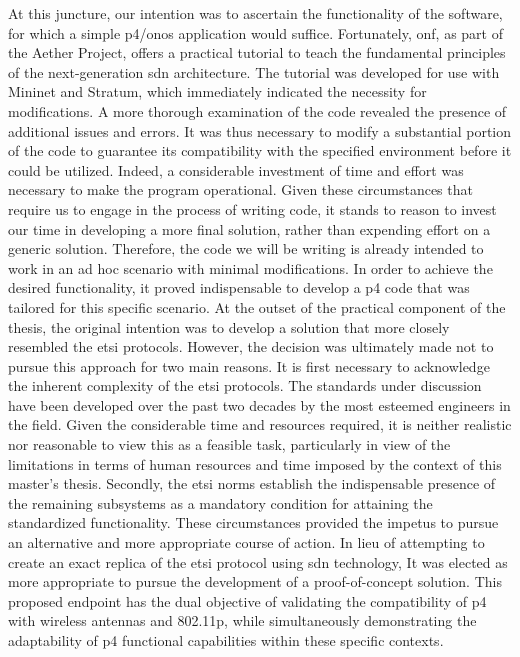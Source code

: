 At this juncture, our intention was to ascertain the functionality of the software, for which a simple \gls{p4}/\gls{onos} application would suffice. Fortunately, \gls{onf}, as part of the Aether Project, offers a practical tutorial to teach the fundamental principles of the next-generation \gls{sdn} architecture. The tutorial was developed for use with Mininet and Stratum, which immediately indicated the necessity for modifications. A more thorough examination of the code revealed the presence of additional issues and errors. It was thus necessary to modify a substantial portion of the code to guarantee its compatibility with the specified environment before it could be utilized. Indeed, a considerable investment of time and effort was necessary to make the program operational. Given these circumstances that require us to engage in the process of writing code, it stands to reason to invest our time in developing a more final solution, rather than expending effort on a generic solution. Therefore, the code we will be writing is already intended to work in an ad hoc scenario with minimal modifications.
In order to achieve the desired functionality, it proved indispensable to develop a \gls{p4} code that was tailored for this specific scenario. At the outset of the practical component of the thesis, the original intention was to develop a solution that more closely resembled the \gls{etsi} protocols. However, the decision was ultimately made not to pursue this approach for two main reasons. It is first necessary to acknowledge the inherent complexity of the \gls{etsi} protocols. The standards under discussion have been developed over the past two decades by the most esteemed engineers in the field. Given the considerable time and resources required, it is neither realistic nor reasonable to view this as a feasible task, particularly in view of the limitations in terms of human resources and time imposed by the context of this master's thesis. Secondly, the \gls{etsi} norms establish the indispensable presence of the remaining subsystems as a mandatory condition for attaining the standardized functionality. These circumstances provided the impetus to pursue an alternative and more appropriate course of action. 
In lieu of attempting to create an exact replica of the \gls{etsi} protocol using \gls{sdn} technology, It was elected as more appropriate to pursue the development of a proof-of-concept solution. This proposed endpoint has the dual objective of validating the compatibility of \gls{p4} with wireless antennas and 802.11p, while simultaneously demonstrating the adaptability of \gls{p4} functional capabilities within these specific contexts. 
